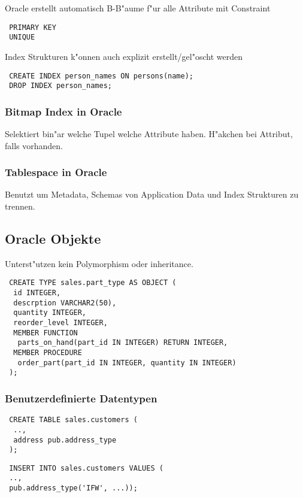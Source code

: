 \documentclass[german, 10pt, a4paper, twocolumn]{scrartcl}
\theoremstyle{definition}
\theoremstyle{remark}
\theoremstyle{example}
\begin{document}
Oracle erstellt automatisch B-B"aume f"ur alle Attribute mit Constraint
\begin{verbatim}
 PRIMARY KEY
 UNIQUE
\end{verbatim}

Index Strukturen k"onnen auch explizit erstellt/gel"oscht werden
\begin{verbatim}
 CREATE INDEX person_names ON persons(name);
 DROP INDEX person_names;
\end{verbatim}

\subsubsection{Bitmap Index in Oracle}

Selektiert bin"ar welche Tupel welche Attribute haben. H"akchen bei Attribut, falls vorhanden.

\subsubsection{Tablespace in Oracle}

Benutzt um Metadata, Schemas von Application Data und Index Strukturen zu trennen.

\subsection{Oracle Objekte}

Unterst"utzen kein Polymorphism oder inheritance.

\small
\begin{verbatim}
 CREATE TYPE sales.part_type AS OBJECT (
  id INTEGER,
  descrption VARCHAR2(50),
  quantity INTEGER,
  reorder_level INTEGER,
  MEMBER FUNCTION
   parts_on_hand(part_id IN INTEGER) RETURN INTEGER,
  MEMBER PROCEDURE
   order_part(part_id IN INTEGER, quantity IN INTEGER)
 );
\end{verbatim}
\normalsize

\subsubsection{Benutzerdefinierte Datentypen}

\small
\begin{verbatim}
 CREATE TABLE sales.customers (
  ..,
  address pub.address_type
 );
\end{verbatim}
\normalsize

\small
\begin{verbatim}
 INSERT INTO sales.customers VALUES (
 ..,
 pub.address_type('IFW', ...));
\end{verbatim}
\normalsize
\end{document}
